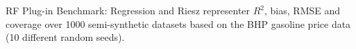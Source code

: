 \documentclass[nohyperref]{article}
\theoremstyle{plain}
\theoremstyle{definition}
\theoremstyle{remark}
\begin{document}
\begin{table}[!htbp]
    \centering
    \caption{RF Plug-in Benchmark: Regression and Riesz representer $R^2$, bias, RMSE and coverage over 1000 semi-synthetic datasets based on the BHP gasoline price data (10 different random seeds).}\label{tab:plugin_RF}
    \vspace{1em}
    \begin{subtable}{.45\textwidth}
    
    \end{subtable}
    ~~~~~
    \begin{subtable}{.45\textwidth}
    
    \end{subtable}
\end{table}
\end{document}
